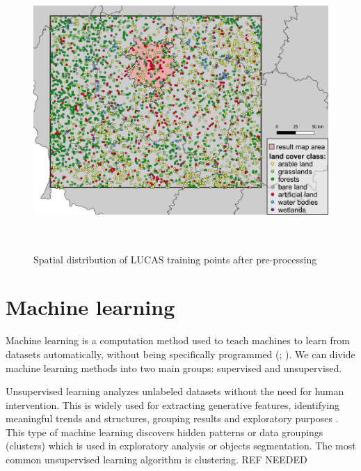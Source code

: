 \documentclass{amuthesis}
\begin{document}
\begin{figure}[t]

{\centering \includegraphics[width=1\textwidth,height=4.16667in]{./figures/lucas_distribution.png}

}

\caption{\label{fig-rycina3}Spatial distribution of LUCAS training
points after pre-processing}

\end{figure}

\hypertarget{sec-ml}{%
\section{Machine learning}\label{sec-ml}}

Machine learning is a computation method used to teach machines to learn
from datasets automatically, without being specifically programmed
(\textcite{mahesh_machine_2018}; \textcite{sarker_machine_2021}). We can
divide machine learning methods into two main groups: supervised and
unsupervised.

Unsupervised learning analyzes unlabeled datasets without the need for
human intervention. This is widely used for extracting generative
features, identifying meaningful trends and structures, grouping results
and exploratory purposes \autocite{sarker_machine_2021}. This type of
machine learning discovers hidden patterns or data groupings (clusters)
which is used in exploratory analysis or objects segmentation. The most
common unsupervised learning algorithm is clustering. REF NEEDED
\end{document}
